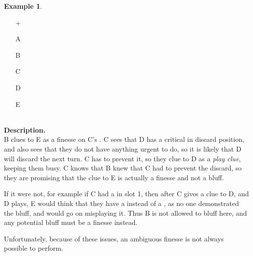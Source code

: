 \documentclass[a4paper]{article}
\theoremstyle{plain}
\theoremstyle{definition}
\newtheorem{example}[theorem]{Example}
\begin{document}
\begin{example}	\hfill \\
	\begin{minipage}{0.45\textwidth}
		\begin{itemize}
			\item[\Large +]      
			\item[\Large A]    
			\item[\Large B]    
			\item[\Large C]     
			\item[\Large D]    
			\item[\Large E]    
		\end{itemize}
	\end{minipage}%
	\begin{minipage}{0.55\textwidth}
		\hfill \\
		
		\textbf{Description.} \\
		
		B clues  to E as a finesse on C's . C sees that D has a critical  in discard position, and also sees that they do not have anything urgent to do, so it is likely that D will discard the next turn. C has to prevent it, so they clue  to D as a \emph{play clue}, keeping them busy. C knows that B knew that C had to prevent the  discard, so they are promising that the  clue to E is actually a finesse and not a bluff.
		
		If it were not, for example if C had a  in slot 1, then after C gives a clue to D, and D plays, E would think that they have a  instead of a , as no one demonstrated the bluff, and would go on misplaying it. Thus B is not allowed to bluff here, and any potential bluff must be a finesse instead.
	\end{minipage}
\end{example} \vspace{0.15 cm}

Unfortunately, because of these issues, an ambiguous finesse is not always possible to perform.
\end{document}
